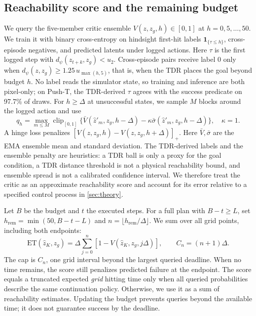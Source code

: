 \documentclass{article}
\newcommand{\ET}{\mathrm{ET}}
\newcommand{\dd}{d_{\psi}}
\newcommand{\ind}{\mathbf{1}}
\theoremstyle{definition}
\theoremstyle{remark}
\begin{document}
\subsection{Reachability score and the remaining budget}
\label{sec:critic}
We query the five-member critic ensemble $V(z,z_g,h)\in[0,1]$ at
$h=0,5,\ldots,50$. We train it with binary cross-entropy on hindsight first-hit labels
$\ind_{\{\tau\le h\}}$, cross-episode negatives, and predicted latents under logged
actions. Here $\tau$ is the first logged step with $\dd(z_{t+k},z_g)<u_2$.
Cross-episode pairs receive label $0$ only when $\dd(z,z_g)\ge 1.25\,u_{\max(h,5)}$,
that is, when the TDR places the goal beyond budget $h$.
No label reads the simulator state, so training and inference are both pixel-only;
on Push-T, the TDR-derived $\tau$ agrees with the success predicate on 97.7\% of draws.
For $h\ge\Delta$ at unsuccessful states, we sample $M$ blocks around the logged action and use
\begin{equation}
 q_h=\max_{m\le M}
 \operatorname{clip}_{[0,1]}
 \{\bar V(\hat z'_m,z_g,h-\Delta)-\kappa\bar\sigma(\hat z'_m,z_g,h-\Delta)\},
 \quad \kappa=1 .
 \label{eq:critic-bootstrap}
\end{equation}
A hinge loss penalizes $[V(z,z_g,h)-V(z,z_g,h+\Delta)]_+$.
Here $\bar V,\bar\sigma$ are the EMA ensemble mean and standard deviation.
The TDR-derived labels and the ensemble penalty are heuristics:
a TDR ball is only a proxy for the goal condition, a TDR distance threshold is not a
physical reachability bound,
and ensemble spread is not a calibrated confidence interval.
We therefore treat the critic as an approximate reachability score and account for its
error relative to a specified control process in \cref{sec:theory}.

Let $B$ be the budget and $t$ the executed steps. For a full plan with $B-t\ge L$,
set $h_{\mathrm{rem}}=\min(50,B-t-L)$ and
$n=\lfloor h_{\mathrm{rem}}/\Delta\rfloor$. We sum over all grid points, including both endpoints:
\begin{equation}
 \ET(\hat z_K,z_g)=\Delta\sum_{j=0}^{n}
                    [1-V(\hat z_K,z_g,j\Delta)],\qquad C_n=(n+1)\Delta.
 \label{eq:et}
\end{equation}
The cap is $C_n$, one grid interval beyond the largest queried deadline.
When no time remains, the score still penalizes predicted failure at the endpoint.
The score equals a truncated expected \emph{grid} hitting time only when all queried
probabilities describe the same continuation policy. Otherwise, we use it as a sum of
reachability estimates. Updating the budget prevents queries beyond the available time;
it does not guarantee success by the deadline.
\end{document}
